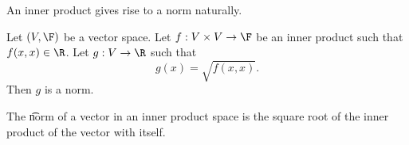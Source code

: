 
\sbasic








































\sstart
{}


An inner product gives rise to a norm naturally.


\begin{prop}
  Let $(V, \F)$ be a vector space.
  Let $f: V \times V \to \F$ be an inner product such that $f(x, x) \in \R$.
Let $g: V \to \R$ such that
\[
  g(x) = \sqrt{f(x, x)}.
\]
Then $g$ is a norm.
\end{prop}

The \t{norm} of a vector in an inner product space is the square root of the inner product of the vector with itself.

\strats
